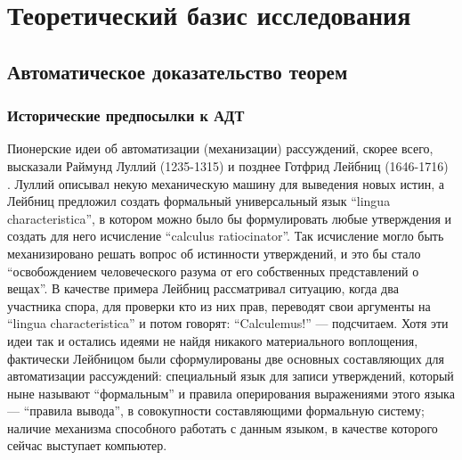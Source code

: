 \chapter{Теоретический базис исследования}
\label{basis}

\section{Автоматическое доказательство теорем}


\subsection{Исторические предпосылки к АДТ}
Пионерские идеи об автоматизации (механизации) рассуждений, скорее всего, высказали Раймунд Луллий (1235-1315) и позднее Готфрид Лейбниц (1646-1716) \cite{LogicComp}. Луллий описывал некую механическую машину для выведения новых истин, а Лейбниц предложил создать формальный универсальный язык ``lingua characteristica'', в котором можно было бы формулировать любые утверждения и создать для него исчисление ``calculus ratiocinator''. Так исчисление могло быть механизировано решать вопрос об истинности утверждений, и это бы стало ``освобождением человеческого разума от его собственных представлений о вещах''. В качестве примера Лейбниц рассматривал ситуацию, когда два участника спора, для проверки кто из них прав, переводят свои аргументы на ``lingua characteristica'' и потом говорят: ``Calculemus!'' --- подсчитаем. Хотя эти идеи так и остались идеями не найдя никакого материального воплощения, фактически Лейбницом были сформулированы две основных составляющих для автоматизации рассуждений: специальный язык для записи утверждений, который ныне называют ``формальным'' и правила оперирования выражениями этого языка --- ``правила вывода'', в совокупности составляющими формальную систему; наличие механизма способного работать с данным языком, в качестве которого сейчас выступает компьютер.


